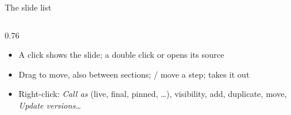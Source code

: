 \begin{standardframe}{The slide list}
\begin{columns}[T,onlytextwidth]
\begin{column}{0.76\linewidth}
\begin{enumerate}
			\end{enumerate}
			\begin{itemize}
				\item A click shows the slide; a double click or  opens its source
				\item Drag to move, also between sections; / move a step;  takes it out
				\item Right-click: \emph{Call as} (live, final, pinned, \ldots), visibility, add, duplicate, move, \emph{Update versions\ldots}
			\end{itemize}
		\end{column}
	\end{columns}
\end{standardframe}
